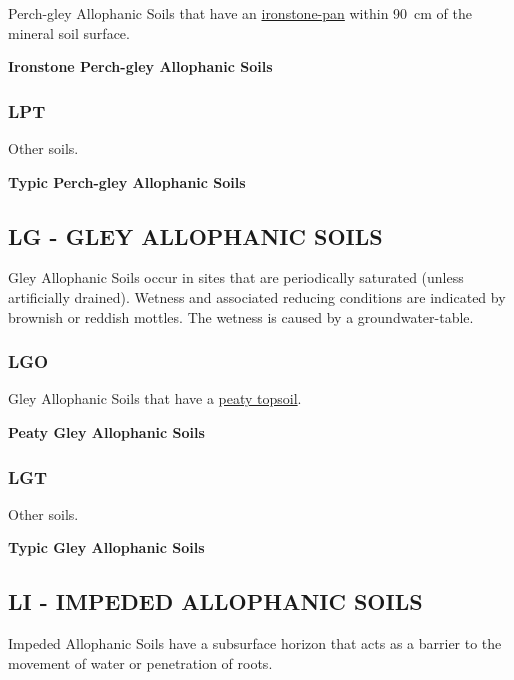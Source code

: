 \documentclass[
  letterpaper,
  DIV=11,
  numbers=noendperiod]{scrreprt}
\begin{document}
Perch-gley Allophanic Soils that have an
\protect\hyperlink{sec-diag-ipan}{ironstone-pan} within 90~cm of the
mineral soil surface.

\textbf{Ironstone Perch-gley Allophanic Soils}

\hypertarget{sec-key-LPT}{%
\subsubsection{\texorpdfstring{\textbf{LPT}}{LPT}}\label{sec-key-LPT}}

Other soils.

\textbf{Typic Perch-gley Allophanic Soils}

\hypertarget{sec-LG}{%
\subsection{\texorpdfstring{\textbf{LG} - GLEY ALLOPHANIC
SOILS}{LG - GLEY ALLOPHANIC SOILS}}\label{sec-LG}}

Gley Allophanic Soils occur in sites that are periodically saturated
(unless artificially drained). Wetness and associated reducing
conditions are indicated by brownish or reddish mottles. The wetness is
caused by a groundwater-table.

\hypertarget{sec-key-LGO}{%
\subsubsection{\texorpdfstring{\textbf{LGO}}{LGO}}\label{sec-key-LGO}}

Gley Allophanic Soils that have a \protect\hyperlink{sec-diag-pts}{peaty
topsoil}.

\textbf{Peaty Gley Allophanic Soils}

\hypertarget{sec-key-LGT}{%
\subsubsection{\texorpdfstring{\textbf{LGT}}{LGT}}\label{sec-key-LGT}}

Other soils.

\textbf{Typic Gley Allophanic Soils}

\hypertarget{sec-LI}{%
\subsection{\texorpdfstring{\textbf{LI} - IMPEDED ALLOPHANIC
SOILS}{LI - IMPEDED ALLOPHANIC SOILS}}\label{sec-LI}}

Impeded Allophanic Soils have a subsurface horizon that acts as a
barrier to the movement of water or penetration of roots.
\end{document}
